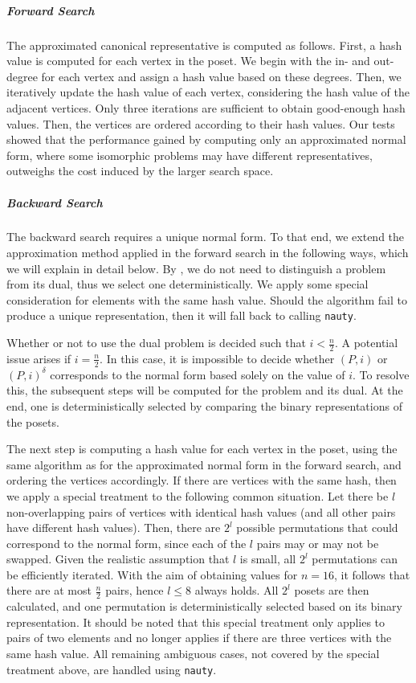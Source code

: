\documentclass[a4paper,UKenglish,cleveref, autoref, thm-restate]{lipics-v2021}
\newcommand{\dual}[1]{{#1}^{\delta}}
\begin{document}
\subparagraph{Forward Search}
The approximated canonical representative is computed as follows.
First, a hash value is computed for each vertex in the poset.
We begin with the in- and out-degree for each vertex and assign a hash value based on these degrees.
Then, we iteratively update the hash value of each vertex, considering the hash value of the adjacent vertices.
Only three iterations are sufficient to obtain good-enough hash values.
Then, the vertices are ordered according to their hash values.
Our tests showed that the performance gained by computing only an approximated normal form, where some isomorphic problems may have different representatives, outweighs the cost induced by the larger search space.

\subparagraph{Backward Search} \label{sec:backward:normal_form}
The backward search requires a unique normal form.
To that end, we extend the approximation method applied in the forward search in the following ways, which we will explain in detail below.
By , we do not need to distinguish a problem from its dual, thus we select one deterministically.
We apply some special consideration for elements with the same hash value.
Should the algorithm fail to produce a unique representation, then it will fall back to calling \texttt{nauty}.

Whether or not to use the dual problem is decided such that $i < \tfrac{n}{2}$.
A potential issue arises if $i = \tfrac{n}{2}$.
In this case, it is impossible to decide whether $(P, i)$ or $\dual{(P, i)}$ corresponds to the normal form based solely on the value of $i$.
To resolve this, the subsequent steps will be computed for the problem and its dual.
At the end, one is deterministically selected by comparing the binary representations of the posets.

The next step is computing a hash value for each vertex in the poset, using the same algorithm as for the approximated normal form in the forward search, and ordering the vertices accordingly.
If there are vertices with the same hash, then we apply a special treatment to the following common situation.
Let there be $l$ non-overlapping pairs of vertices with identical hash values (and all other pairs have different hash values).
Then, there are $2^l$ possible permutations that could correspond to the normal form, since each of the $l$ pairs may or may not be swapped.
Given the realistic assumption that $l$ is small, all $2^l$ permutations can be efficiently iterated.
With the aim of obtaining values for $n = 16$, it follows that there are at most $\frac{n}{2}$ pairs, hence $l \leq 8$ always holds.
All $2^l$ posets are then calculated, and one permutation is deterministically selected based on its binary representation.
It should be noted that this special treatment only applies to pairs of two elements and no longer applies if there are three vertices with the same hash value.
All remaining ambiguous cases, not covered by the special treatment above, are handled using \texttt{nauty}.
\end{document}
